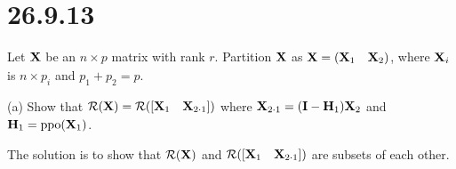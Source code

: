 \section*{26.9.13}
Let $\bf X$ be an $n\times p$ matrix with rank $r$.
Partition $\bf X$ as ${\bf X}=(\begin{matrix}{\bf X}_1&{\bf X}_2
\end{matrix})$,
where ${\bf X}_i$ is $n\times p_i$ and $p_1+p_2=p$.

\bigskip
\noindent
(a) Show that
${\cal R}({\bf X})={\cal R}([\begin{matrix}{\bf X}_1&{\bf X}_{2\cdot1}
\end{matrix}])$
where
${\bf X}_{2\cdot1}=({\bf I}-{\bf H}_1){\bf X}_2$
and ${\bf H}_1=\mathop{\rm ppo}({\bf X}_1)$.

\bigskip
\noindent
The solution is to show that ${\cal R}({\bf X})$ and
${\cal R}([\begin{matrix}{\bf X}_1&{\bf X}_{2\cdot1}\end{matrix}])$
are subsets of each other.

